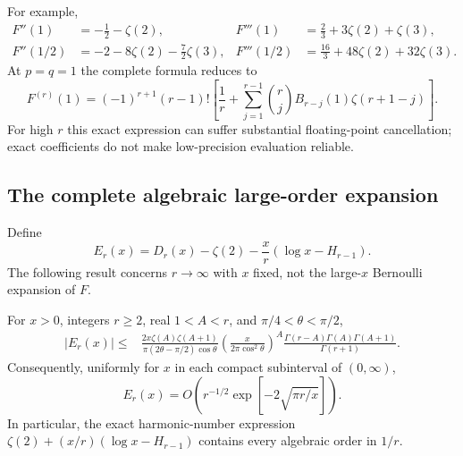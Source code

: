For example,
\begin{align*}
 F''(1)&=-\frac12-\zeta(2),&
 F'''(1)&=\frac23+3\zeta(2)+\zeta(3),\\
 F''(1/2)&=-2-8\zeta(2)-\frac72\zeta(3),&
 F'''(1/2)&=\frac{16}3+48\zeta(2)+32\zeta(3).
\end{align*}
At $p=q=1$ the complete formula reduces to
\[
 F^{(r)}(1)=(-1)^{r+1}(r-1)!
 \left[\frac1r+
 \sum_{j=1}^{r-1}\binom rj B_{r-j}(1)\zeta(r+1-j)\right].
\]
For high $r$ this exact expression can suffer substantial floating-point
cancellation; exact coefficients do not make low-precision evaluation
reliable.

\subsection{The complete algebraic large-order expansion}

Define
\[
 E_r(x)=D_r(x)-\zeta(2)-\frac xr(\log x-H_{r-1}).
\]
The following result concerns $r\to\infty$ with $x$ fixed, not the
large-$x$ Bernoulli expansion of $F$.

\begin{theorem}\label{thm:herglotz-bound}
For $x>0$, integers $r\ge2$, real $1<A<r$, and
$\pi/4<\theta<\pi/2$,
\begin{align*}
 |E_r(x)|\le{}&
 \frac{2x\zeta(A)\zeta(A+1)}
 {\pi(2\theta-\pi/2)\cos\theta}
 \left(\frac{x}{2\pi\cos^2\theta}\right)^A
 \frac{\Gamma(r-A)\Gamma(A)\Gamma(A+1)}{\Gamma(r+1)}.
\end{align*}
Consequently, uniformly for $x$ in each compact subinterval of $(0,\infty)$,
\[
 E_r(x)=O\left(r^{-1/2}\exp[-2\sqrt{\pi r/x}]\right).
\]
In particular, the exact harmonic-number expression
$\zeta(2)+(x/r)(\log x-H_{r-1})$ contains every algebraic order in $1/r$.
\end{theorem}

